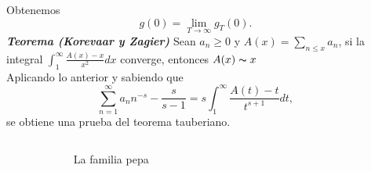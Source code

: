 \documentclass[final]{beamer}
\newlength{\sepwidth}
\newlength{\colwidth}
\newcommand{\separatorcolumn}{\begin{column}{\sepwidth}\end{column}}
\newcommand{\defi}[1]{\textbf{\emph{#1}}}
\begin{document}
\begin{frame}[t,fragile]
\begin{columns}[t]
\begin{column}{\colwidth}
Obtenemos \[
g(0) = \lim _{T \rightarrow \infty} g_T(0).
\]
\defi{Teorema (Korevaar y Zagier) }Sean $a_n\geq 0$ y $A(x)=\displaystyle\sum_{n\leq x} a_n$, si  la integral $\displaystyle\int_1^{\infty}\frac{A(x)-x}{x^2}dx$
converge, entonces $A(x)\thicksim x$\\
\vspace*{0.2cm}
Aplicando lo anterior y sabiendo que 
\[
\sum_{n=1}^{\infty}a_nn^{-s} - \frac{s}{s-1} = s \int_1^{\infty} \frac{A(t)-t}{t^{s+1}} d t,
\]
se obtiene una prueba del teorema tauberiano.
\end{column}

\separatorcolumn

\end{columns}
\end{frame}

\newpage
\thispagestyle{empty}
\vspace*{-1.5cm}

\begin{frame}[t,fragile]
\begin{columns}[t]
\separatorcolumn
\begin{column}{\colwidth}

\begin{block}{La familia pepa}
\lipsum[1]
\end{block}
\lipsum[2-6]

\end{column}

\separatorcolumn

\begin{column}{\colwidth}
\lipsum[1-7]
\end{column}

\separatorcolumn

\end{columns}
\end{frame}
\end{document}
